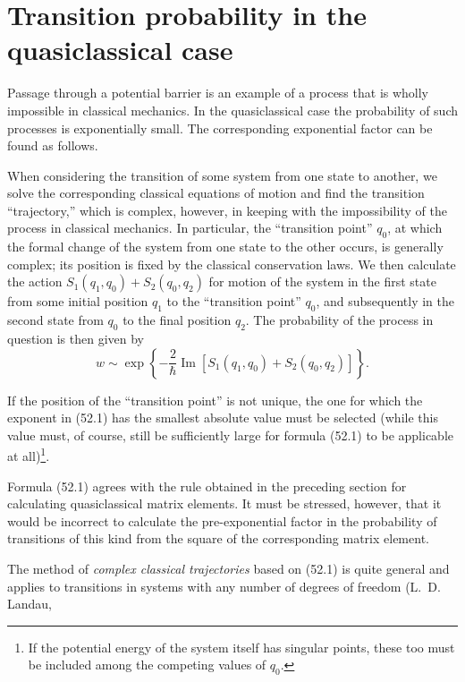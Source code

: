 \section{Transition probability in the quasiclassical case}

Passage through a potential barrier is an example of a process that is wholly
impossible in classical mechanics. In the quasiclassical case the probability
of such processes is exponentially small. The corresponding exponential
factor can be found as follows.

When considering the transition of some system from one state to another, we
solve the corresponding classical equations of motion and find the transition
``trajectory,'' which is complex, however, in keeping with the impossibility
of the process in classical mechanics. In particular, the ``transition
point'' $q_0$, at which the formal change of the system from one state to the
other occurs, is generally complex; its position is fixed by the classical
conservation laws. We then calculate the action
$S_1(q_1,q_0)+S_2(q_0,q_2)$ for motion of the system in the first state from
some initial position $q_1$ to the ``transition point'' $q_0$, and subsequently
in the second state from $q_0$ to the final position $q_2$. The probability of
the process in question is then given by
\begin{equation}
 w\sim\exp\left\{-\frac2\hbar\operatorname{Im}
 [S_1(q_1,q_0)+S_2(q_0,q_2)]\right\}.
 \tag{52.1}
\end{equation}

If the position of the ``transition point'' is not unique, the one for which
the exponent in (52.1) has the smallest absolute value must be selected (while
this value must, of course, still be sufficiently large for formula (52.1) to
be applicable at all)\footnote{If the potential energy of the system itself
has singular points, these too must be included among the competing values of
$q_0$.}.

Formula (52.1) agrees with the rule obtained in the preceding section for
calculating quasiclassical matrix elements. It must be stressed, however, that
it would be incorrect to calculate the pre-exponential factor in the
probability of transitions of this kind from the square of the corresponding
matrix element.

The method of \emph{complex classical trajectories} based on (52.1) is quite
general and applies to transitions in systems with any number of degrees of
freedom (L.~D. Landau,

